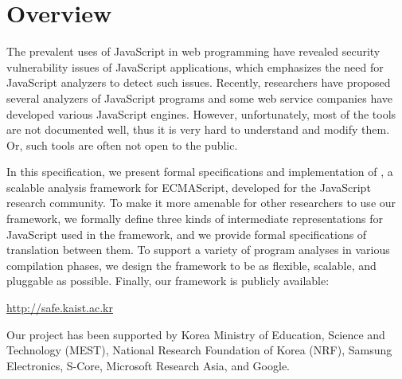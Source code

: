 \chapter{Overview}

The prevalent uses of JavaScript in web programming have revealed
security vulnerability issues of JavaScript applications,
which emphasizes the need for JavaScript analyzers to detect such issues.
Recently, researchers have proposed several analyzers of JavaScript programs
and some web service companies have developed various JavaScript engines.
However, unfortunately, most of the tools are not documented well,
thus it is very hard to understand and modify them.
Or, such tools are often not open to the public.


In this specification, we present formal specifications and implementation
of \safe, a scalable analysis framework for ECMAScript, developed for the JavaScript research community.
To make it more amenable for other researchers to use our framework,
we formally define three kinds of intermediate representations for JavaScript
used in the framework,
and we provide formal specifications of translation between them.
To support a variety of program analyses in various compilation phases,
we design the framework to be as flexible, scalable, and pluggable as possible.
Finally, our framework is publicly available:
\begin{center}
\url{http://safe.kaist.ac.kr}
\end{center}
Our project has been supported by
Korea Ministry of Education, Science and Technology (MEST),
National Research Foundation of Korea (NRF),
Samsung Electronics,
S-Core,
Microsoft Research Asia, and
Google.

